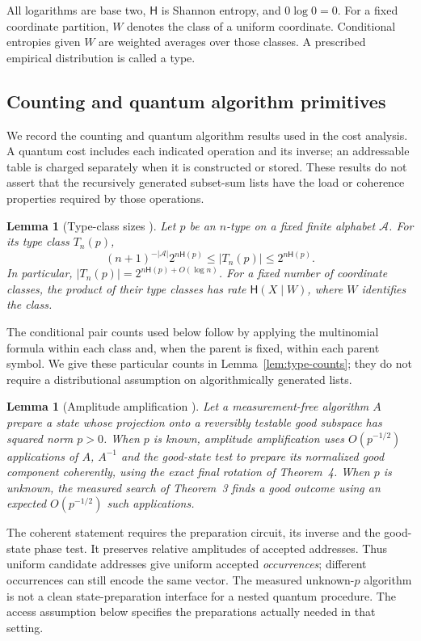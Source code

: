 \documentclass[10pt,a4paper]{article}
\newtheorem{lemma}[theorem]{Lemma}
\theoremstyle{definition}
\newcommand{\HH}{\mathsf H}
\begin{document}
All logarithms are base two, $\HH$ is Shannon entropy, and $0\log0=0$.
For a fixed coordinate partition, $W$ denotes the class of a uniform
coordinate. Conditional entropies given $W$ are weighted averages over
those classes. A prescribed empirical distribution is called a type.


\subsection{Counting and quantum algorithm primitives}
\label{sec:imported-primitives}

We record the counting and quantum algorithm results used in the cost
analysis. A quantum cost includes each indicated operation and its inverse;
an addressable table is charged separately when it is constructed or stored.
These results do not assert that the recursively generated subset-sum lists
have the load or coherence properties required by those operations.

\begin{lemma}[Type-class sizes {\cite[Theorem~11.1.3]{CT06}}]
\label{lem:type-size}
Let $p$ be an $n$-type on a fixed finite alphabet $\mathcal A$.
For its type class $T_n(p)$,
\[
 (n+1)^{-|\mathcal A|}2^{n\HH(p)}
 \leq |T_n(p)|\leq 2^{n\HH(p)}.
\]
In particular, $|T_n(p)|=2^{n\HH(p)+O(\log n)}$.
For a fixed number of coordinate classes, the product of their type classes
has rate $\HH(X\mid W)$, where $W$ identifies the class.
\end{lemma}
The conditional pair counts used below follow by applying the multinomial
formula within each class and, when the parent is fixed, within each parent
symbol. We give these particular counts in Lemma~\ref{lem:type-counts};
they do not require a distributional assumption on algorithmically
generated lists.

\begin{lemma}[Amplitude amplification
  {\cite[Theorems~3 and~4]{BHMT}}]
\label{lem:amplitude-amplification}
Let a measurement-free algorithm $A$ prepare a state whose projection onto
a reversibly testable good subspace has squared norm $p>0$.
When $p$ is known, amplitude amplification uses $O(p^{-1/2})$ applications
of $A$, $A^{-1}$ and the good-state test to prepare its normalized good
component coherently, using the exact final rotation of Theorem~4.
When $p$ is unknown, the measured search of Theorem~3 finds a good outcome
using an expected $O(p^{-1/2})$ such applications.
\end{lemma}
The coherent statement requires the preparation circuit, its inverse and
the good-state phase test. It preserves relative amplitudes of accepted
addresses. Thus uniform candidate addresses give uniform accepted
\emph{occurrences}; different occurrences can still encode the same vector.
The measured unknown-$p$ algorithm is not a clean state-preparation
interface for a nested quantum procedure. The access assumption below
specifies the preparations actually needed in that setting.
\end{document}
